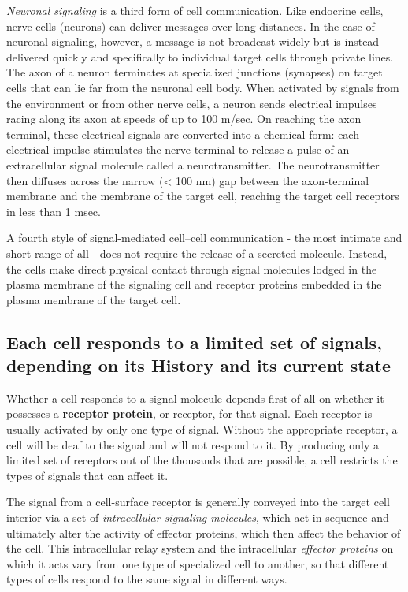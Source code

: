 \textit{Neuronal signaling} is a third form of cell communication. Like endocrine
cells, nerve cells (neurons) can deliver messages over long distances.
In the case of neuronal signaling, however, a message is not broadcast
widely but is instead delivered quickly and specifically to individual target
cells through private lines. The axon of a neuron terminates at specialized
junctions (synapses) on target cells that can lie far from the neuronal cell body.
When activated by signals from the environment or from other
nerve cells, a neuron sends electrical impulses racing along its axon at
speeds of up to 100 m/sec. On reaching the axon terminal, these electrical
signals are converted into a chemical form: each electrical impulse
stimulates the nerve terminal to release a pulse of an extracellular signal
molecule called a neurotransmitter. The neurotransmitter then diffuses
across the narrow (< 100 nm) gap between the axon-terminal membrane
and the membrane of the target cell, reaching the target cell receptors in
less than 1 msec.

A fourth style of signal-mediated cell–cell communication - the most intimate
and short-range of all - does not require the release of a secreted
molecule. Instead, the cells make direct physical contact through signal
molecules lodged in the plasma membrane of the signaling cell and
receptor proteins embedded in the plasma membrane of the target cell.

\subsection{Each cell responds to a limited set of signals, depending on its History and its current state}

Whether a cell responds to a signal molecule depends first of all on
whether it possesses a \textbf{receptor protein}, or receptor, for that signal.
Each receptor is usually activated by only one type of signal. Without the
appropriate receptor, a cell will be deaf to the signal and will not respond
to it. By producing only a limited set of receptors out of the thousands
that are possible, a cell restricts the types of signals that can affect it.

The signal from a cell-surface
receptor is generally conveyed into the target cell interior via a set of
\textit{intracellular signaling molecules}, which act in sequence and ultimately
alter the activity of effector proteins, which then affect the behavior of the
cell. This intracellular relay system and the intracellular \textit{effector proteins}
on which it acts vary from one type of specialized cell to another, so that
different types of cells respond to the same signal in different ways.

